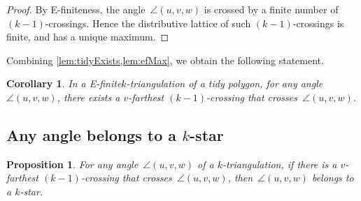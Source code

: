 \documentclass{amsart}
\newtheorem{proposition}[theorem]{Proposition}
\newtheorem{corollary}[theorem]{Corollary}
\theoremstyle{remark}
\newcommand*{\ef}[0]{E-finite\xspace}
\newcommand*{\ktg}[0]{$k$-triangulation\xspace}
\begin{document}
\begin{proof}
By \ef{}ness, the angle~$\angle(u,v,w)$ is crossed by a finite number of $(k-1)$-crossings. Hence the distributive lattice of such $(k-1)$-crossings is finite, and has a unique maximum.
\end{proof}

Combining \cref{lem:tidyExists,lem:efMax}, we obtain the following statement.

\begin{corollary}
\label{coro:farthestTidy}
In a \ef \ktg of a tidy polygon, for any angle~$\angle(u,v,w)$, there exists a $v$-farthest $(k-1)$-crossing that crosses~$\angle(u,v,w)$.
\end{corollary}

\subsection{Any angle belongs to a $k$-star}

\begin{proposition}
\label{prop:angleBelongStar}
For any angle~$\angle(u,v,w)$ of a \ktg, if there is a $v$-farthest $(k-1)$-crossing that crosses~$\angle(u,v,w)$, then~$\angle(u,v,w)$ belongs to a $k$-star.
\end{proposition}
\end{document}
